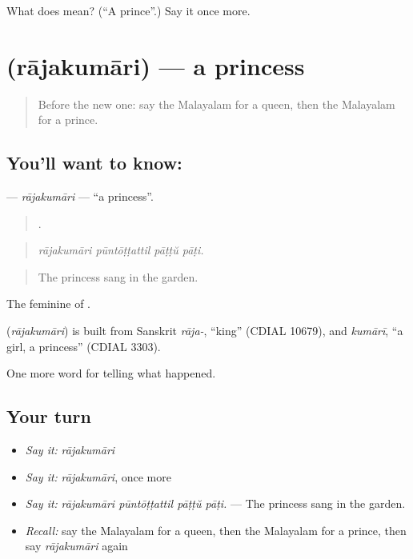 \begin{tcolorbox}[breakable,colback=teal!4,colframe=teal!35!black,title={Before you move on}]
What does  mean? (\textquotedblleft{}A prince\textquotedblright{}.) Say it once more.
\end{tcolorbox}
\section[\texorpdfstring{\ml{രാജകുമാരി} (rājakumāri)}{രാജകുമാരി (rājakumāri)}]{ (rājakumāri) — a princess}

\label{lesson:ML-C397-rajakumari}



\begin{quote}
Before the new one: say the Malayalam for a queen, then the Malayalam for a prince.
\end{quote}

\subsection*{You'll want to know: }
\textbf{} — \emph{rājakumāri} — \textquotedblleft{}a princess\textquotedblright{}.

\begin{quote}
   .
\end{quote}

\begin{quote}
\emph{rājakumāri pūntōṭṭattil pāṭṭŭ pāṭi.}
\end{quote}

\begin{quote}
The princess sang in the garden.
\end{quote}

The feminine of .

\begin{cousinweb}
\textbf{} (\emph{rājakumāri}) is built from Sanskrit \emph{rāja-}, \textquotedblleft{}king\textquotedblright{} (CDIAL 10679), and \emph{kumārī}, \textquotedblleft{}a girl, a princess\textquotedblright{} (CDIAL 3303).
\end{cousinweb}

\begin{grammarlens}[title={What you've built}]
One more word for telling what happened.
\end{grammarlens}

\subsection*{Your turn}
\begin{itemize}
\raggedright
  \item \emph{Say it:} \emph{rājakumāri}
  \item \emph{Say it:} \emph{rājakumāri}, once more
  \item \emph{Say it:} \emph{rājakumāri pūntōṭṭattil pāṭṭŭ pāṭi.} — The princess sang in the garden.
  \item \emph{Recall:} say the Malayalam for a queen, then the Malayalam for a prince, then say \emph{rājakumāri} again
\end{itemize}

